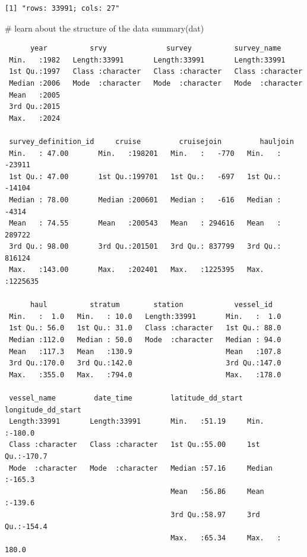 \documentclass[
  letterpaper,
  oneside,
  open=any]{scrbook}
\newenvironment{Shaded}{\begin{snugshade}}{\end{snugshade}}
\newcommand{\CommentTok}[1]{\textcolor[rgb]{0.37,0.37,0.37}{#1}}
\newcommand{\FunctionTok}[1]{\textcolor[rgb]{0.28,0.35,0.67}{#1}}
\newcommand{\NormalTok}[1]{\textcolor[rgb]{0.00,0.23,0.31}{#1}}
\begin{document}
\begin{verbatim}
[1] "rows: 33991; cols: 27"
\end{verbatim}

\begin{Shaded}
\begin{Highlighting}[]
\CommentTok{\# learn about the structure of the data}
\FunctionTok{summary}\NormalTok{(dat)}
\end{Highlighting}
\end{Shaded}

\begin{verbatim}
      year          srvy              survey          survey_name       
 Min.   :1982   Length:33991       Length:33991       Length:33991      
 1st Qu.:1997   Class :character   Class :character   Class :character  
 Median :2006   Mode  :character   Mode  :character   Mode  :character  
 Mean   :2005                                                           
 3rd Qu.:2015                                                           
 Max.   :2024                                                           
                                                                        
 survey_definition_id     cruise         cruisejoin         hauljoin      
 Min.   : 47.00       Min.   :198201   Min.   :   -770   Min.   : -23911  
 1st Qu.: 47.00       1st Qu.:199701   1st Qu.:   -697   1st Qu.: -14104  
 Median : 78.00       Median :200601   Median :   -616   Median :  -4314  
 Mean   : 74.55       Mean   :200543   Mean   : 294616   Mean   : 289722  
 3rd Qu.: 98.00       3rd Qu.:201501   3rd Qu.: 837799   3rd Qu.: 816124  
 Max.   :143.00       Max.   :202401   Max.   :1225395   Max.   :1225635  
                                                                          
      haul          stratum        station            vessel_id    
 Min.   :  1.0   Min.   : 10.0   Length:33991       Min.   :  1.0  
 1st Qu.: 56.0   1st Qu.: 31.0   Class :character   1st Qu.: 88.0  
 Median :112.0   Median : 50.0   Mode  :character   Median : 94.0  
 Mean   :117.3   Mean   :130.9                      Mean   :107.8  
 3rd Qu.:170.0   3rd Qu.:142.0                      3rd Qu.:147.0  
 Max.   :355.0   Max.   :794.0                      Max.   :178.0  
                                                                   
 vessel_name         date_time         latitude_dd_start longitude_dd_start
 Length:33991       Length:33991       Min.   :51.19     Min.   :-180.0    
 Class :character   Class :character   1st Qu.:55.00     1st Qu.:-170.7    
 Mode  :character   Mode  :character   Median :57.16     Median :-165.3    
                                       Mean   :56.86     Mean   :-139.6    
                                       3rd Qu.:58.97     3rd Qu.:-154.4    
                                       Max.   :65.34     Max.   : 180.0    
                                                                           

\end{verbatim}
\end{document}
